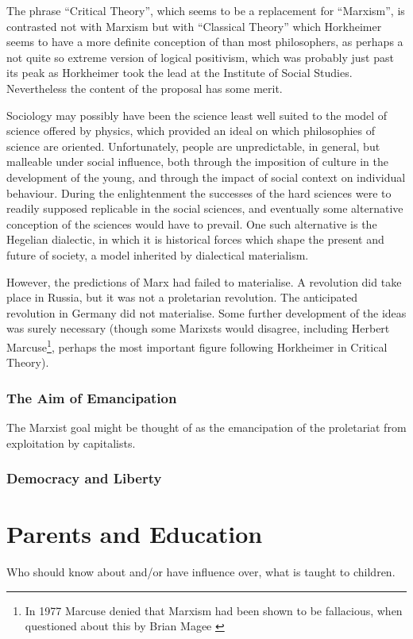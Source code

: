 \documentclass[10pt,titlepage]{book}
\begin{document}
The phrase ``Critical Theory'', which seems to be a replacement for ``Marxism'', is contrasted not with Marxism but with ``Classical Theory'' which Horkheimer seems to have a more definite conception of than most philosophers, as perhaps a not quite so extreme version of logical positivism, which was probably just past its peak as Horkheimer took the lead at the Institute of Social Studies.
Nevertheless the content of the proposal has some merit.

Sociology may possibly have been the science least well suited to the model of science offered by physics, which provided an ideal on which philosophies of science are oriented.
Unfortunately, people are unpredictable, in general, but malleable under social influence, both through the imposition of culture in the development of the young, and through the impact of social context on individual behaviour.
During the enlightenment the successes of the hard sciences were to readily supposed replicable in the social sciences, and eventually some alternative conception of the sciences would have to prevail.
One such alternative is the Hegelian dialectic, in which it is historical forces which shape the present and future of society, a model inherited by dialectical materialism.

However, the predictions of Marx had failed to materialise.
A revolution did take place in Russia, but it was not a proletarian revolution.
The anticipated revolution in Germany did not materialise.
Some further development of the ideas was surely necessary (though some Marixsts would disagree, including Herbert Marcuse\footnote{
 In 1977 Marcuse denied that Marxism had been shown to be fallacious, when questioned about this by Brian Magee \cite{magee-marcuse}}, perhaps the most important figure following Horkheimer in Critical Theory).

\subsection{The Aim of Emancipation}

The Marxist goal might be thought of as the emancipation of the proletariat from exploitation by capitalists.

\subsection{Democracy and Liberty}

\chapter{Parents and Education}
Who should know about and/or have influence over, what is taught to children.
\end{document}
